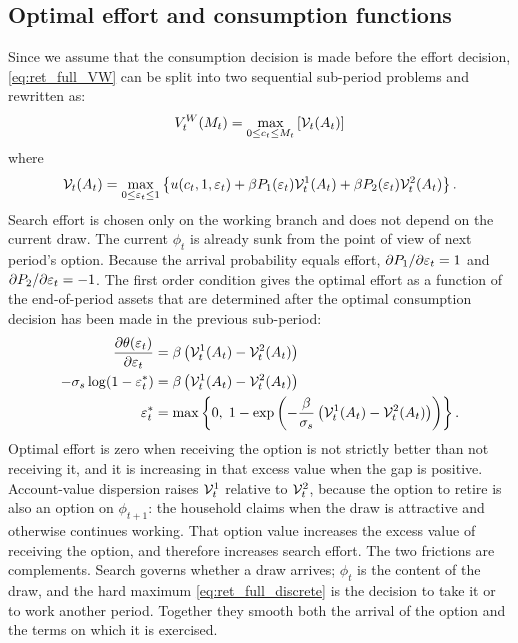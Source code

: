 \subsection{Optimal effort and consumption functions}
Since we assume that the consumption decision is made before the effort decision,
\eqref{eq:ret_full_VW} can be split into two sequential sub-period problems and rewritten as:
\begin{equation}
V_t^{W}(M_t) = \max_{0 \le c_t \le M_t} \left[ \mathcal{V}_t(A_t) \right]
\end{equation}
where
\begin{equation}
\mathcal{V}_t(A_t) = \max_{0 \le \varepsilon_t \le 1}
\left\{ u(c_t, 1, \varepsilon_t) + \beta P_1(\varepsilon_t) \mathcal{V}_t^1(A_t) + \beta P_2(\varepsilon_t) \mathcal{V}_t^2(A_t) \right\}.
\end{equation}
Search effort is chosen only on the working branch and does not depend on the current
draw. The current $\phi_t$ is already sunk from the point of view of next period's option.
Because the arrival probability equals effort, $\partial P_1/\partial \varepsilon_t = 1$ and
$\partial P_2/\partial \varepsilon_t = -1$. The first order condition gives the optimal effort as a
function of the end-of-period assets that are determined after the optimal consumption
decision has been made in the previous sub-period:
\begin{align}
\frac{\partial \theta(\varepsilon_t)}{\partial \varepsilon_t}
&= \beta \left( \mathcal{V}_t^1(A_t) - \mathcal{V}_t^2(A_t) \right) \\
-\sigma_s \log(1 - \varepsilon_t^*)
&= \beta \left( \mathcal{V}_t^1(A_t) - \mathcal{V}_t^2(A_t) \right) \\
\varepsilon_t^* &= \max\left\{0,\; 1 - \exp\left( -\frac{\beta}{\sigma_s}
\left( \mathcal{V}_t^1(A_t) - \mathcal{V}_t^2(A_t) \right) \right)\right\}.
\label{eq:ret_full_effort}
\end{align}
Optimal effort is zero when receiving the option is not strictly better than not receiving
it, and it is increasing in that excess value when the gap is positive. Account-value
dispersion raises $\mathcal{V}_t^1$ relative to $\mathcal{V}_t^2$, because the
option to retire is also an option on $\phi_{t+1}$: the household claims when the draw is
attractive and otherwise continues working. That option value increases the excess value
of receiving the option, and therefore increases search effort. The two frictions are
complements. Search governs whether a draw arrives; $\phi_t$ is the content of the draw,
and the hard maximum \eqref{eq:ret_full_discrete} is the decision to take it or to work
another period. Together they smooth both the arrival of the option and the terms on
which it is exercised.

